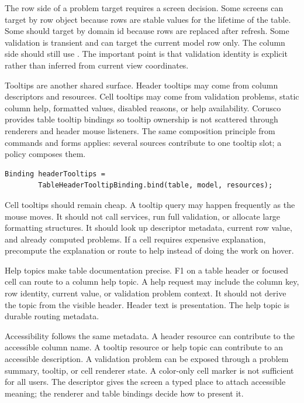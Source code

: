 The row side of a problem target requires a screen decision. Some screens can
target by row object because rows are stable values for the lifetime of the
table. Some should target by domain id because rows are replaced after
refresh. Some validation is transient and can target the current model row
only. The column side should still use . The important point is
that validation identity is explicit rather than inferred from current view
coordinates.

Tooltips are another shared surface. Header tooltips may come from column
descriptors and resources. Cell tooltips may come from validation problems,
static column help, formatted values, disabled reasons, or help availability.
Corusco provides table tooltip bindings so tooltip ownership is not scattered
through renderers and header mouse listeners. The same composition principle
from commands and forms applies: several sources contribute to one tooltip
slot; a policy composes them.

\begin{lstlisting}[caption={Header tooltip binding uses descriptor resources.}]
Binding headerTooltips =
        TableHeaderTooltipBinding.bind(table, model, resources);
\end{lstlisting}

Cell tooltips should remain cheap. A tooltip query may happen frequently as
the mouse moves. It should not call services, run full validation, or allocate
large formatting structures. It should look up descriptor metadata, current
row value, and already computed problems. If a cell requires expensive
explanation, precompute the explanation or route to help instead of doing the
work on hover.

Help topics make table documentation precise. F1 on a table header or focused
cell can route to a column help topic. A help request may include the column
key, row identity, current value, or validation problem context. It should not
derive the topic from the visible header. Header text is presentation. The
help topic is durable routing metadata.

Accessibility follows the same metadata. A header resource can contribute to
the accessible column name. A tooltip resource or help topic can contribute to
an accessible description. A validation problem can be exposed through a
problem summary, tooltip, or cell renderer state. A color-only cell marker is
not sufficient for all users. The descriptor gives the screen a typed place to
attach accessible meaning; the renderer and table bindings decide how to
present it.

